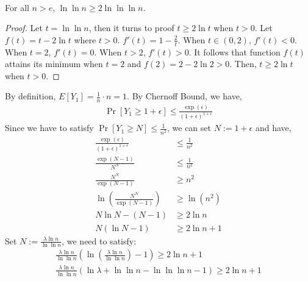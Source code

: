 \noindent {}\\
\begin{claim}\label{1}
    For all $n> e$, $\ln \ln n  \ge 2\ln \ln \ln n$.
\end{claim}
\begin{proof}
    Let $t=\ln \ln n$, then it turns to proof $t\ge 2\ln t$ when $t> 0$.
    Let $f(t)=t-2\ln t$ where $t> 0$.
    $f'(t)=1-\frac{2}{t}$. 
    When $t\in (0,2)$, $f'(t)<0$.
    When $t=2$, $f'(t)=0$.
    When $t>2$, $f'(t)>0$.
    It follows that function $f(t)$ attains its minimum when $t=2$ and $f(2)=2-2\ln 2>0$.
    Then, $t\ge 2\ln t$ when $t>0$.
\end{proof}
\noindent By definition, $E[Y_1]=\frac{1}{n}\cdot n =1$.
By Chernoff Bound, we have,
\begin{align}
    \nonumber \Pr[Y_1\ge 1+\epsilon] \le \frac{\exp(\epsilon)}{(1+\epsilon)^{1+\epsilon}}
\end{align}
Since we have to satisfy $\Pr[Y_1\ge N] \le \frac{1}{n^2}$, we can set $N:=1+\epsilon$ and have,
\begin{align}
    \nonumber \frac{\exp(\epsilon)}{(1+\epsilon)^{1+\epsilon}}&\le \frac{1}{n^2}\\
    \nonumber \frac{\exp({N-1})}{N^N}&\le \frac{1}{n^2}\\
    \nonumber \frac{N^N}{\exp({N-1})}&\ge n^2\\
    \nonumber  \ln (\frac{N^N}{\exp({N-1})})&\ge \ln (n^2)\\
    \nonumber N \ln N - (N-1) &\ge 2\ln n \\
    \nonumber N(\ln N -1) & \ge 2\ln n +1
\end{align}
Set $N:=\frac{\lambda \ln n}{\ln \ln n}$, we need to satisfy:
\begin{align}
    \nonumber \frac{\lambda \ln n}{\ln \ln n}(\ln (\frac{\lambda \ln n}{\ln \ln n})-1) \ge 2\ln n +1\\
    \nonumber \frac{\lambda \ln n}{\ln \ln n}(\ln \lambda +\ln\ln n -\ln \ln \ln n -1) \ge 2\ln n +1
\end{align}

